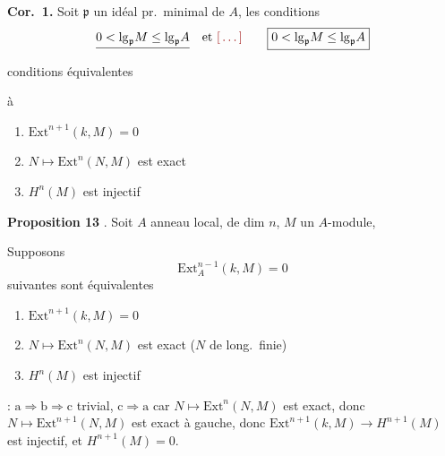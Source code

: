 \documentclass[11pt,a4paper]{article}
\begin{document}
\textbf{Cor.\ 1.} Soit $\mathfrak{p}$ un idéal pr.\ minimal de $A$, les
conditions   \struck{\ill{} \ill{}}
\[
  \struck{0 < \mathrm{lg}_{\mathfrak{p}} M \leq \mathrm{lg}_{\mathfrak{p}} A}
  \quad \text{et} \ \ill{} \qquad
  \boxed{0 < \mathrm{lg}_{\mathfrak{p}} M \leq \mathrm{lg}_{\mathfrak{p}} A}
\]
\ill{} \ill{} conditions équivalentes


à \ill{} \ill{} \ill{}
\begin{enumerate}
  \item[a')] $\mathrm{Ext}^{n+1}(k, M) = 0$
  \item[b')] $N \mapsto \mathrm{Ext}^n(N, M)$ est exact
  \item[c')] $H^n(M)$ est injectif
\end{enumerate}

\textbf{Proposition 13} . Soit $A$ anneau local,
de dim $n$, $M$ un $A$-module, \struck{\ill{}}
 \ill{}

Supposons
\[
  \boxed{\mathrm{Ext}^{n-1}_A(k, M) = 0}
\]
\struck{\ill{}} \ill{} suivantes sont équivalentes
\begin{enumerate}
  \item[a')] $\mathrm{Ext}^{n+1}(k, M) = 0$
  \item[b')] $N \mapsto \mathrm{Ext}^n(N, M)$ est exact ($N$ de long.\ finie)
  \item[c')] $H^n(M)$ est injectif
\end{enumerate}

 :
$\mathrm{a} \Rightarrow \mathrm{b} \Rightarrow \mathrm{c}$ trivial,
$\mathrm{c} \Rightarrow \mathrm{a}$ car $N \mapsto \mathrm{Ext}^n(N, M)$
est exact, donc
$N \mapsto \mathrm{Ext}^{n+1}(N, M)$ est exact à gauche,
donc $\mathrm{Ext}^{n+1}(k, M) \to H^{n+1}(M)$ est injectif, et
$H^{n+1}(M) = 0$.
\end{document}
